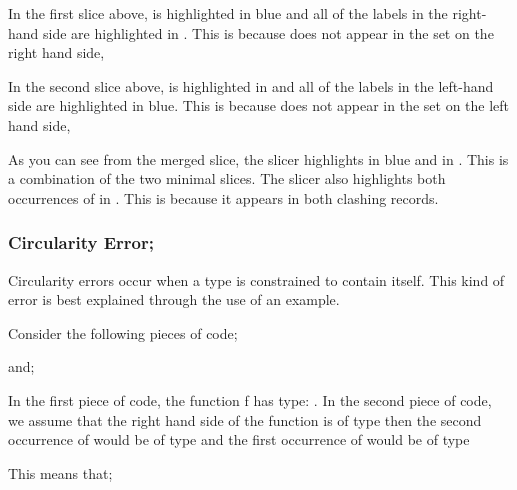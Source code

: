 \documentclass{report}
\begin{document}
\begin{itemize}
In the first slice above,  is highlighted in blue
and all of the labels in the right-hand side are highlighted in
\tesEndPointOne. This is because  does not
appear in the set on the right hand side, 

In the second slice above,  is highlighted in
\tesEndPointOne and all of the labels in the left-hand side are
highlighted in blue. This is because  does not appear
in the set on the left hand side, 

As you can see from the merged slice, the slicer highlights
 in blue and  in
\tesEndPointOne. This is a combination of the two minimal slices. The slicer
also highlights both occurrences of  in
\tesEndPointOne. This is because it appears in both clashing records.


\newpage


\subsubsection{Circularity Error;}

\subitem Circularity errors occur when a type is constrained to
contain itself. This kind of error is best explained through the use
of an example.

Consider the following pieces of code;


and;


In the first piece of code, the function f has type:
.  In the second piece of code, we assume
that the right hand side of the function is of type 
then the second occurrence of  would be of type
 and the first occurrence of
 would be of type 

This means that;



\end{itemize}
\end{document}
